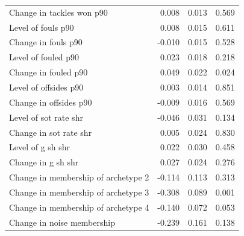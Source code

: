 \begin{tabular}{lrrr}
Change in tackles won p90 & 0.008 & 0.013 & 0.569 \\
Level of fouls p90 & 0.008 & 0.015 & 0.611 \\
Change in fouls p90 & -0.010 & 0.015 & 0.528 \\
Level of fouled p90 & 0.023 & 0.018 & 0.218 \\
Change in fouled p90 & 0.049 & 0.022 & 0.024 \\
Level of offsides p90 & 0.003 & 0.014 & 0.851 \\
Change in offsides p90 & -0.009 & 0.016 & 0.569 \\
Level of sot rate shr & -0.046 & 0.031 & 0.134 \\
Change in sot rate shr & 0.005 & 0.024 & 0.830 \\
Level of g sh shr & 0.022 & 0.030 & 0.458 \\
Change in g sh shr & 0.027 & 0.024 & 0.276 \\
Change in membership of archetype 2 & -0.114 & 0.113 & 0.313 \\
Change in membership of archetype 3 & -0.308 & 0.089 & 0.001 \\
Change in membership of archetype 4 & -0.140 & 0.072 & 0.053 \\
Change in noise membership & -0.239 & 0.161 & 0.138 \\
\bottomrule
\end{tabular}
